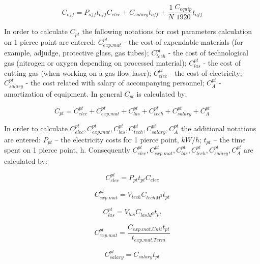 \documentclass[runningheads]{llncs}
\begin{document}
\begin{equation}
  \label{eq1.10}
  C_{off}
  = P_{off} t_{off} C_{elec}
  + C_{salary} t_{off}
  + \frac{1}N \frac{C_{equip}}{1920} t_{off}
\end{equation}

In order to calculate $C_{pt}$
the following notations for cost parameters calculation on 1 pierce point are entered:
$C^{pt}_{exp.mat}$ - the cost of expendable materials
(for example, adjudge, protective glass, gas tubes);
$C^{pt}_{tech}$ - the cost of technological gas
(nitrogen or oxygen depending on processed material);
$C^{pt}_{las}$ - the cost of cutting gas
(when working on a gas flow laser);
$C^{pt}_{elec}$ - the cost of electricity;
$C^{pt}_{salary}$ - the cost related with salary of accompanying personnel;
$C^{pt}_A$ - amortization of equipment.
In general
$C_{pt}$
is calculated by:

\begin{equation}
  \label{eq1.11}
  C_{pt}
  = C^{pt}_{elec}
  + C^{pt}_{exp.mat}
  + C^{pt}_{las}
  + C^{pt}_{tech}
  + C^{pt}_{salary}
  + C^{pt}_A
\end{equation}

In order to calculate
$C^{pt}_{elec}, C^{pt}_{exp.mat}, C^{pt}_{las}, C^{pt}_{tech}, C^{pt}_{salary}, C^{pt}_A$
the additional notations are entered:
$P_{pt}$ – the electricity costs for 1 pierce point, $kW/h$;
$t_{pt}$  – the time spent on 1 pierce point, h.
Consequently
$C^{pt}_{elec}, C^{pt}_{exp.mat}, C^{pt}_{las}, C^{pt}_{tech}, C^{pt}_{salary}, C^{pt}_A$
are calculated by:

\begin{equation}
  \label{eq1.12}
  C^{pt}_{elec} = P_{pt} t_{pt} C_{elec}
\end{equation}

\begin{equation}
  \label{eq1.13}
  C^{pt}_{exp.mat} = V_{tech} C_{tech M^3} t_{pt}
\end{equation}

\begin{equation}
  \label{eq1.14}
  C^{pt}_{las} = V_{las} C_{las M^3} t_{pt}
\end{equation}

\begin{equation}
  \label{eq1.15}
  C^{pt}_{exp.mat} = \frac{C_{exp.mat.Unit} t_{pt}}{t_{exp.mat.Term}}
\end{equation}

\begin{equation}
  \label{eq1.16}
  C^{pt}_{salary} = C_{salary} t_{pt}
\end{equation}
\end{document}
